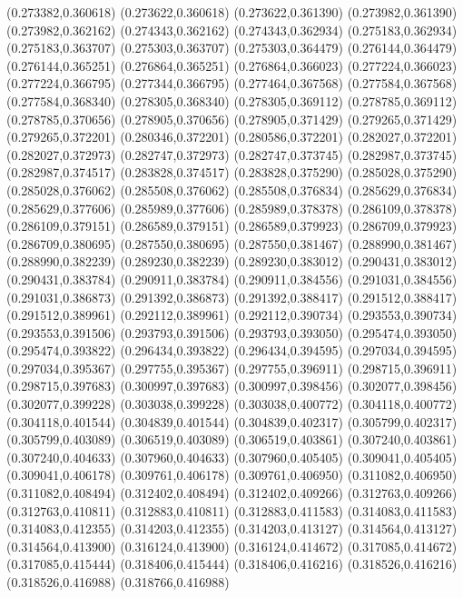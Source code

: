 (0.273382,0.360618)
(0.273622,0.360618)
(0.273622,0.361390)
(0.273982,0.361390)
(0.273982,0.362162)
(0.274343,0.362162)
(0.274343,0.362934)
(0.275183,0.362934)
(0.275183,0.363707)
(0.275303,0.363707)
(0.275303,0.364479)
(0.276144,0.364479)
(0.276144,0.365251)
(0.276864,0.365251)
(0.276864,0.366023)
(0.277224,0.366023)
(0.277224,0.366795)
(0.277344,0.366795)
(0.277464,0.367568)
(0.277584,0.367568)
(0.277584,0.368340)
(0.278305,0.368340)
(0.278305,0.369112)
(0.278785,0.369112)
(0.278785,0.370656)
(0.278905,0.370656)
(0.278905,0.371429)
(0.279265,0.371429)
(0.279265,0.372201)
(0.280346,0.372201)
(0.280586,0.372201)
(0.282027,0.372201)
(0.282027,0.372973)
(0.282747,0.372973)
(0.282747,0.373745)
(0.282987,0.373745)
(0.282987,0.374517)
(0.283828,0.374517)
(0.283828,0.375290)
(0.285028,0.375290)
(0.285028,0.376062)
(0.285508,0.376062)
(0.285508,0.376834)
(0.285629,0.376834)
(0.285629,0.377606)
(0.285989,0.377606)
(0.285989,0.378378)
(0.286109,0.378378)
(0.286109,0.379151)
(0.286589,0.379151)
(0.286589,0.379923)
(0.286709,0.379923)
(0.286709,0.380695)
(0.287550,0.380695)
(0.287550,0.381467)
(0.288990,0.381467)
(0.288990,0.382239)
(0.289230,0.382239)
(0.289230,0.383012)
(0.290431,0.383012)
(0.290431,0.383784)
(0.290911,0.383784)
(0.290911,0.384556)
(0.291031,0.384556)
(0.291031,0.386873)
(0.291392,0.386873)
(0.291392,0.388417)
(0.291512,0.388417)
(0.291512,0.389961)
(0.292112,0.389961)
(0.292112,0.390734)
(0.293553,0.390734)
(0.293553,0.391506)
(0.293793,0.391506)
(0.293793,0.393050)
(0.295474,0.393050)
(0.295474,0.393822)
(0.296434,0.393822)
(0.296434,0.394595)
(0.297034,0.394595)
(0.297034,0.395367)
(0.297755,0.395367)
(0.297755,0.396911)
(0.298715,0.396911)
(0.298715,0.397683)
(0.300997,0.397683)
(0.300997,0.398456)
(0.302077,0.398456)
(0.302077,0.399228)
(0.303038,0.399228)
(0.303038,0.400772)
(0.304118,0.400772)
(0.304118,0.401544)
(0.304839,0.401544)
(0.304839,0.402317)
(0.305799,0.402317)
(0.305799,0.403089)
(0.306519,0.403089)
(0.306519,0.403861)
(0.307240,0.403861)
(0.307240,0.404633)
(0.307960,0.404633)
(0.307960,0.405405)
(0.309041,0.405405)
(0.309041,0.406178)
(0.309761,0.406178)
(0.309761,0.406950)
(0.311082,0.406950)
(0.311082,0.408494)
(0.312402,0.408494)
(0.312402,0.409266)
(0.312763,0.409266)
(0.312763,0.410811)
(0.312883,0.410811)
(0.312883,0.411583)
(0.314083,0.411583)
(0.314083,0.412355)
(0.314203,0.412355)
(0.314203,0.413127)
(0.314564,0.413127)
(0.314564,0.413900)
(0.316124,0.413900)
(0.316124,0.414672)
(0.317085,0.414672)
(0.317085,0.415444)
(0.318406,0.415444)
(0.318406,0.416216)
(0.318526,0.416216)
(0.318526,0.416988)
(0.318766,0.416988)
